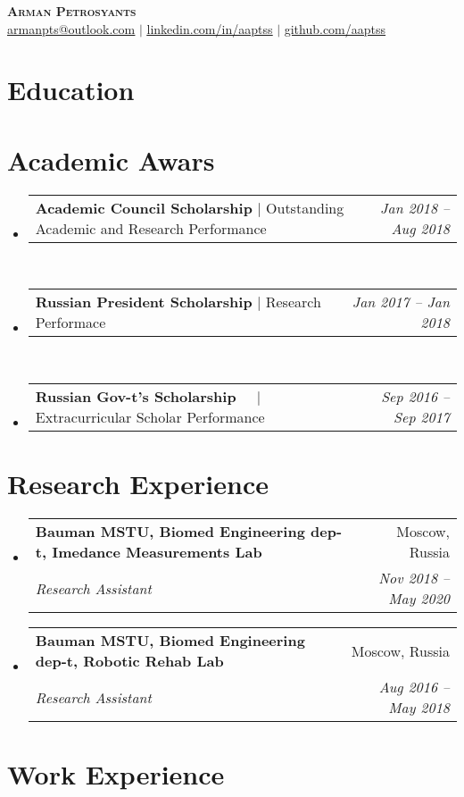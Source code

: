 \documentclass[a4paper,11pt]{article}
\makeatletter
\newcommand{\resumeSubheading}[4]{
  \vspace{-2pt}\item
    \begin{tabular*}{0.97\textwidth}[t]{l@{\extracolsep{\fill}}r}
      \textbf{#1} & #2 \\
      \textit{\small#3} & \textit{\small #4} \\
    \end{tabular*}\vspace{-7pt}
}
\newcommand{\resumeProjectHeading}[2]{
    \item
    \begin{tabular*}{0.97\textwidth}{l@{\extracolsep{\fill}}r}
      \small#1 & #2 \\
    \end{tabular*}\vspace{-7pt}
}
\newcommand{\resumeSubHeadingListStart}{\begin{itemize}[leftmargin=0.15in, label={}]}
\newcommand{\resumeSubHeadingListEnd}{\end{itemize}}
\newcommand{\DesPosition}{ }
\makeatother
\begin{document}
\begin{center}
    \textbf{\Huge \scshape Arman Petrosyants \DesPosition } \\ \vspace{1pt}
    \href{mailto:armanpts@outlook.com}{\underline{armanpts@outlook.com}} $|$ 
    \href{https://linkedin.com/in/aaptss}{\underline{linkedin.com/in/aaptss}} $|$
    \href{https://github.com/aaptss}{\underline{github.com/aaptss}}
\end{center}

\section{Education}
  \resumeSubHeadingListStart
	
	
	
  \resumeSubHeadingListEnd

\section{Academic Awars}
    \resumeSubHeadingListStart      
      \resumeProjectHeading
          {\textbf{Academic Council Scholarship} $|$ {Outstanding Academic and Research Performance}}{\emph{Jan 2018 -- Aug 2018}}\\
      \resumeProjectHeading
          {\textbf{Russian President Scholarship} $|$ {Research Performace}}{\emph{Jan 2017 -- Jan 2018}}\\
      \resumeProjectHeading
          {\textbf{Russian Gov-t's Scholarship} $\> \> \> \> \> |$ {Extracurricular Scholar Performance}}{\emph{Sep 2016 -- Sep 2017}}
    \resumeSubHeadingListEnd

\section{Research Experience}
  \resumeSubHeadingListStart
	
    \resumeSubheading
      {Bauman MSTU, Biomed Engineering dep-t, Imedance Measurements Lab}{Moscow, Russia}
      {Research Assistant}{Nov 2018 -- May 2020}
	
	
    \resumeSubheading
      {Bauman MSTU, Biomed Engineering dep-t, Robotic Rehab Lab}{Moscow, Russia}
      {Research Assistant}{Aug 2016 -- May 2018}
	
  	
  \resumeSubHeadingListEnd

\section{Work Experience}
  \resumeSubHeadingListStart
%	
 	 
%	
 	 
  \resumeSubHeadingListEnd
\end{document}
